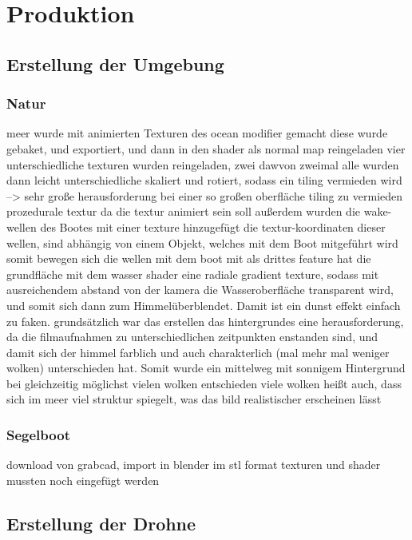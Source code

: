 \chapter{Produktion}

\section{Erstellung der Umgebung}

\subsection{Natur}

meer wurde mit animierten Texturen des ocean modifier gemacht
diese wurde gebaket, und exportiert, und dann in den shader als normal map reingeladen
vier unterschiedliche texturen wurden reingeladen, zwei dawvon zweimal
alle wurden dann leicht unterschiedliche skaliert und rotiert, sodass ein tiling vermieden wird
--> sehr große herausforderung bei einer so großen oberfläche tiling zu vermieden
prozedurale textur da die textur animiert sein soll
außerdem wurden die wake-wellen des Bootes mit einer texture hinzugefügt
die textur-koordinaten dieser wellen, sind abhängig von einem Objekt, welches mit dem Boot mitgeführt wird
somit bewegen sich die wellen mit dem boot mit
als drittes feature hat die grundfläche mit dem wasser shader eine radiale gradient texture, sodass mit ausreichendem abstand von der kamera die Wasseroberfläche transparent wird, und somit sich dann zum Himmelüberblendet. Damit ist ein dunst effekt einfach zu faken.
grundsätzlich war das erstellen das hintergrundes eine herausforderung, da die filmaufnahmen zu unterschiedlichen zeitpunkten enstanden sind, und damit sich der himmel farblich und auch charakterlich (mal mehr mal weniger wolken) unterschieden hat. Somit wurde ein mittelweg mit sonnigem Hintergrund bei gleichzeitig möglichst vielen wolken entschieden
viele wolken heißt auch, dass sich im meer viel struktur spiegelt, was das bild realistischer erscheinen lässt

\subsection{Segelboot}

download von grabcad, import in blender im stl format
texturen und shader mussten noch eingefügt werden

\section{Erstellung der Drohne}

